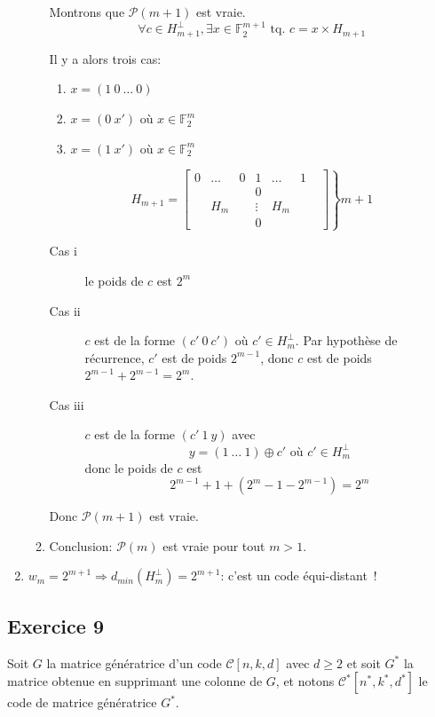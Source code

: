 \documentclass[a4paper,10pt,twocolumn]{article}
\theoremstyle{break}
\newcommand{\code}[1]{\mathcal{#1}}
\newcommand{\C}{\code{C}}
\newcommand{\F}{\mathbb{F}}
\newcommand{\FF}{\F_2}
\newcommand{\FFn}[1]{\FF^{#1}}
\begin{document}
\begin{enumerate}
\begin{enumerate}
  Montrons que $\mathcal{P}(m+1)$ est vraie.
  $$ \forall c \in H_{m+1}^\bot, \exists x \in \FFn{m+1} \text{ tq. } c = x \times H_{m+1} $$
  
  Il y a alors trois cas:
  \begin{enumerate}
   \item $x=(1\ 0\ \ldots\ 0)$
   \item $x=(0\ x')$ où $x \in \FFn{m}$
   \item $x=(1\ x')$ où $x \in \FFn{m}$
  \end{enumerate}

$$ H_{m+1} = \left.
\begin{bmatrix}
 0 & \ldots & 0 & 1 & \ldots & 1 \\
 & & & 0 & & \\
 & H_m & & \vdots & H_m & & \\
 & & & 0 & &  
\end{bmatrix}\right\}m+1$$

  \begin{description}
   \item[Cas i] le poids de $c$ est $2^m$
   \item[Cas ii] $c$ est de la forme $(c'\ 0\ c')$ où $c' \in H_m^\bot$. 
                 Par hypothèse de récurrence, $c'$ est de poids $2^{m-1}$,
                 donc $c$ est de poids $2^{m-1} + 2^{m-1} = 2^m$.
   \item[Cas iii] $c$ est de la forme $(c'\ 1\ y)$ avec 
                  $$y = (1\ \ldots\ 1) \oplus c' \text{ où } c' \in H_m^\bot$$
                  donc le poids de $c$ est 
                  $$2^{m-1} + 1 + (2^m - 1 - 2^{m-1}) = 2^m$$
  \end{description}
  Donc $\mathcal{P}(m+1)$ est vraie.
  \item Conclusion: $\mathcal{P}(m)$ est vraie pour tout $m > 1$.
 \end{enumerate}

 \item $w_m = 2^{m+1} \Rightarrow d_{min}(H_m^\bot)=2^{m+1}$: c'est un code équi-distant~!
\end{enumerate}

\subsection*{Exercice 9}
Soit $G$ la matrice génératrice d'un code $\C[n,k,d]$ avec $d \ge 2$
et soit $G^*$ la matrice obtenue en supprimant une colonne de $G$,
et notons $\C^*[n^*, k^*, d^*]$ le code de matrice génératrice $G^*$.
\end{document}
